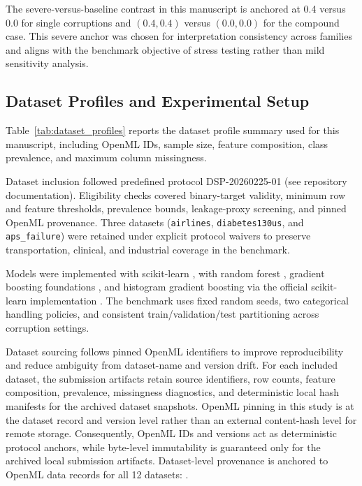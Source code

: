 \documentclass{AuthorGuide/ijitcs}
\newcommand{\fittableinput}[1]{%
\begingroup
\setlength{\tabcolsep}{4pt}%
\resizebox{\textwidth}{!}{}%
\endgroup
}
\begin{document}
The severe-versus-baseline contrast in this manuscript is anchored at 0.4 versus 0.0 for single corruptions and $(0.4,0.4)$ versus $(0.0,0.0)$ for the compound case. This severe anchor was chosen for interpretation consistency across families and aligns with the benchmark objective of stress testing rather than mild sensitivity analysis.

\subsection{Dataset Profiles and Experimental Setup}
Table~\ref{tab:dataset_profiles} reports the dataset profile summary used for this manuscript, including OpenML IDs, sample size, feature composition, class prevalence, and maximum column missingness.

\begin{table}[!t]
\caption{Dataset profile summary (from \texttt{../results/tables/table\_dataset\_profiles.csv}).\label{tab:dataset_profiles}}
\footnotesize
\fittableinput{../results/tables/table_dataset_profiles.tex}
\end{table}

Dataset inclusion followed predefined protocol DSP-20260225-01 (see repository documentation). Eligibility checks covered binary-target validity, minimum row and feature thresholds, prevalence bounds, leakage-proxy screening, and pinned OpenML provenance. Three datasets (\texttt{airlines}, \texttt{diabetes130us}, and \texttt{aps\_failure}) were retained under explicit protocol waivers to preserve transportation, clinical, and industrial coverage in the benchmark.

Models were implemented with scikit-learn \cite{pedregosa2011scikit}, with random forest \cite{breiman2001random}, gradient boosting foundations \cite{friedman2001gbm}, and histogram gradient boosting via the official scikit-learn implementation \cite{sklearnHGBDocs}. The benchmark uses fixed random seeds, two categorical handling policies, and consistent train/validation/test partitioning across corruption settings.

Dataset sourcing follows pinned OpenML identifiers to improve reproducibility and reduce ambiguity from dataset-name and version drift. For each included dataset, the submission artifacts retain source identifiers, row counts, feature composition, prevalence, missingness diagnostics, and deterministic local hash manifests for the archived dataset snapshots.
OpenML pinning in this study is at the dataset record and version level rather than an external content-hash level for remote storage. Consequently, OpenML IDs and versions act as deterministic protocol anchors, while byte-level immutability is guaranteed only for the archived local submission artifacts.
Dataset-level provenance is anchored to OpenML data records for all 12 datasets:
\cite{openml_d1590_adult,openml_d42493_airlines,openml_d41138_apsfailure,openml_d1461_bank_marketing,openml_d44162_compass,openml_d42477_credit_default,openml_d43903_diabetes_hospitals_fairlearn,openml_d45022_diabetes130us,openml_d151_electricity,openml_d41162_kick,openml_d43904_law_school_admission,openml_d45568_telco_churn}.
\end{document}

